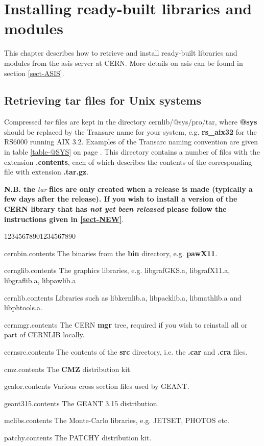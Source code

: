 \chapter{Installing ready-built libraries and modules}

This chapter describes how to retrieve and install ready-built libraries
and modules from the asis server at CERN. More details on asis
can be found in section \ref{sect-ASIS}.

\section{Retrieving tar files for Unix systems}

Compressed {\it tar} files are kept in the directory 
cernlib/@sys/pro/tar, where {\bf @sys} should be replaced
by the Transarc name for your system, e.g. {\bf rs\_aix32} for
the RS6000 running AIX 3.2. Examples of the Transarc
naming convention are given in table \ref{table-@SYS} on
page \pageref{table-@SYS}.
This directory contains a number
of files with the extension {\bf .contents}, each of which
describes the contents of the corresponding file with
extension {\bf .tar.gz}.

{\bf N.B. the} {\it tar} {\bf files are only created when a release
is made (typically a few days after the release). If you wish to
install a version of the CERN library that has {\it not yet been
released} please follow the instructions given in \ref{sect-NEW}}.

\begin{DLtt}{12345678901234567890}
\item[cernbin.contents]The binaries from the {\bf bin} directory, e.g. {\bf pawX11}.
\item[cernglib.contents]The graphics libraries, e.g. libgrafGKS.a, libgrafX11.a, libgraflib.a,
libpawlib.a
\item[cernlib.contents]Libraries such as libkernlib.a, libpacklib.a, libmathlib.a and libphtools.a.
\item[cernmgr.contents]The CERN {\bf mgr} tree, required if you wish to reinstall all or part
of CERNLIB locally.
\item[cernsrc.contents]The contents of the {\bf src} directory, i.e. the {\bf .car} 
and {\bf .cra} files.
\item[cmz.contents]The {\bf CMZ} distribution kit.
\item[gcalor.contents]Various cross section files used by GEANT.
\item[geant315.contents]The GEANT 3.15 distribution.
\item[mclibs.contents]The Monte-Carlo libraries, e.g. JETSET, PHOTOS etc.
\item[patchy.contents]The PATCHY distribution kit.
\end{DLtt}

